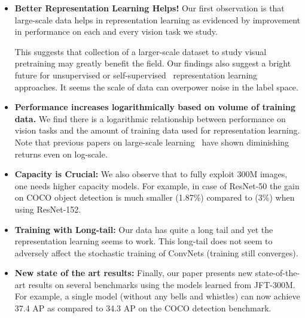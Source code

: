 \documentclass[10pt,twocolumn,letterpaper]{article}
\begin{document}
\begin{itemize}
    \itemsep0em 
    \item {\bf Better Representation Learning Helps!} Our first observation is that large-scale data helps in representation learning as evidenced by improvement in performance on each and every vision task we study.
    
    This suggests that collection of a larger-scale dataset to study visual pretraining may greatly benefit the field. Our findings also suggest a bright future for unsupervised or self-supervised~\cite{DBLP:journals/corr/WangG15a, doersch2015unsupervised} representation learning approaches. It seems the scale of data can overpower noise in the label space.
    \item {\bf Performance increases logarithmically based on volume of training data.} We find there is a logarithmic relationship between performance on vision tasks and the amount of training data used for representation learning. Note that previous papers on large-scale learning~\cite{JoulinWeakly} have shown diminishing returns even on log-scale.
    
    \item {\bf Capacity is Crucial:} We also observe that to fully exploit 300M images, one needs higher capacity models. For example, in case of ResNet-50 the gain on COCO object detection is much smaller (1.87\%) compared to (3\%) when using ResNet-152.
    
    \item {\bf Training with Long-tail:} Our data has quite a long tail and yet the representation learning seems to work. This long-tail does not seem to adversely affect the stochastic training of ConvNets (training still converges).
    
    \item {\bf New state of the art results:} Finally, our paper presents new state-of-the-art results on several benchmarks using the models learned from JFT-300M. For example, a single model (without any bells and whistles) can now achieve 37.4 AP as compared to 34.3 AP on the COCO detection benchmark.
\end{itemize}
\end{document}
